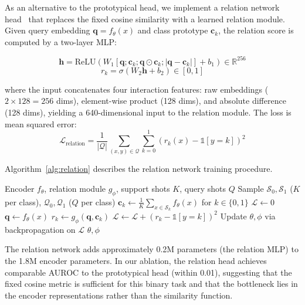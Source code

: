 As an alternative to the prototypical head, we implement a relation network head~\cite{sung2018learning} that replaces the fixed cosine similarity with a learned relation module. Given query embedding $\mathbf{q} = f_\theta(x)$ and class prototype $\mathbf{c}_k$, the relation score is computed by a two-layer MLP:

\begin{equation}
\mathbf{h} = \text{ReLU}(W_1 [\mathbf{q}; \mathbf{c}_k; \mathbf{q} \odot \mathbf{c}_k; |\mathbf{q} - \mathbf{c}_k|] + b_1) \in \mathbb{R}^{256}
\end{equation}
\begin{equation}
r_k = \sigma(W_2 \mathbf{h} + b_2) \in [0,1]
\end{equation}

where the input concatenates four interaction features: raw embeddings ($2 \times 128 = 256$ dims), element-wise product (128 dims), and absolute difference (128 dims), yielding a 640-dimensional input to the relation module. The loss is mean squared error:
\begin{equation}
\mathcal{L}_{\text{relation}} = \frac{1}{|\mathcal{Q}|} \sum_{(x,y) \in \mathcal{Q}} \sum_{k=0}^{1} (r_k(x) - \mathbb{1}[y=k])^2
\end{equation}

Algorithm~\ref{alg:relation} describes the relation network training procedure.

\begin{algorithm}[htbp]
\caption{Relation Network Episodic Training}
\label{alg:relation}
\begin{algorithmic}[1]
\Require Encoder $f_\theta$, relation module $g_\phi$, support shots $K$, query shots $Q$
\State Sample $\mathcal{S}_0, \mathcal{S}_1$ ($K$ per class), $\mathcal{Q}_0, \mathcal{Q}_1$ ($Q$ per class)
\State $\mathbf{c}_k \gets \frac{1}{K}\sum_{x \in \mathcal{S}_k} f_\theta(x)$ for $k \in \{0,1\}$
\State $\mathcal{L} \gets 0$
\State $\mathbf{q} \gets f_\theta(x)$
\State $r_k \gets g_\phi(\mathbf{q}, \mathbf{c}_k)$
\State $\mathcal{L} \gets \mathcal{L} + (r_k - \mathbb{1}[y=k])^2$
\EndFor
\EndFor
\State Update $\theta, \phi$ via backpropagation on $\mathcal{L}$
\EndFor
\State \Return $\theta, \phi$
\end{algorithmic}
\end{algorithm}

The relation network adds approximately 0.2M parameters (the relation MLP) to the 1.8M encoder parameters. In our ablation, the relation head achieves comparable AUROC to the prototypical head (within 0.01), suggesting that the fixed cosine metric is sufficient for this binary task and that the bottleneck lies in the encoder representations rather than the similarity function.

